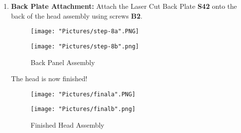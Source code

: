 \documentclass{article}
\begin{document}
\begin{enumerate}
\item \textbf{Back Plate Attachment:} Attach the Laser Cut Back Plate \textbf{S42} onto the back of the head assembly using screws \textbf{B2}.

\begin{figure}[H]
	\centering
  	\begin{minipage}[b]{0.45\textwidth}
		\texttt{[image: "Pictures/step-8a".PNG]}
  	\end{minipage}
  	\hfill
  	\begin{minipage}[b]{0.45\textwidth}
    		\texttt{[image: "Pictures/step-8b".png]}
  	\end{minipage}
  	\caption{Back Panel Assembly}
\end{figure}


The head is now finished!

\begin{figure}[H]
	\centering
  	\begin{minipage}[b]{0.45\textwidth}
		\texttt{[image: "Pictures/finala".PNG]}
  	\end{minipage}
  	\hfill
  	\begin{minipage}[b]{0.45\textwidth}
    		\texttt{[image: "Pictures/finalb".png]}
  	\end{minipage}
  	\caption{Finished Head Assembly}
\end{figure}

\end{enumerate}
\end{document}
